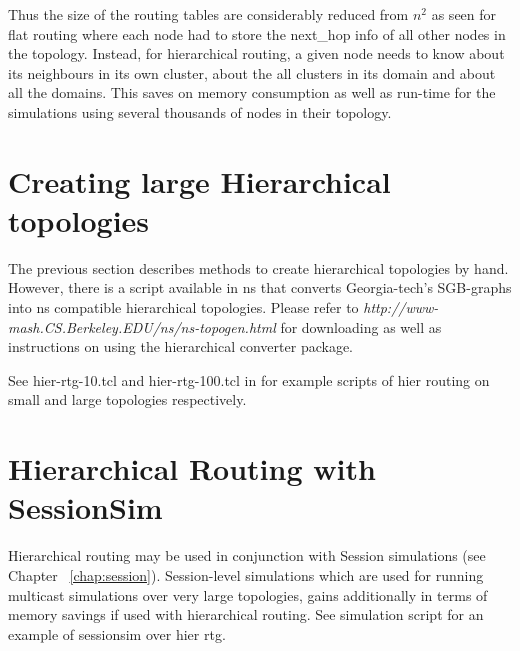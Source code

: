 Thus the size of the routing tables are considerably reduced from 
$n^{2}$ as seen for flat routing where each node had to store the
  next\_hop info of all other nodes in the topology. Instead, for
  hierarchical routing, a given node needs to know about its neighbours
  in its own cluster, about the all clusters in its domain and about all
  the domains. This saves on memory consumption as well as run-time for
  the simulations using several thousands of nodes in their topology.


\section{Creating large Hierarchical topologies}
\label{large-hier-topo}
The previous section describes methods to create hierarchical topologies
by hand. However, there is a script available in ns that converts
Georgia-tech's SGB-graphs into ns compatible hierarchical topologies.
Please refer to {\em http://www-mash.CS.Berkeley.EDU/ns/ns-topogen.html}
for downloading as well as instructions on using the hierarchical
converter package. 

See hier-rtg-10.tcl and hier-rtg-100.tcl in  for example
scripts of hier routing on small and large topologies
respectively. 

\section{Hierarchical Routing with SessionSim}
\label{sec:hier-rtg-with-sessionsim}

Hierarchical routing may be used in conjunction with Session simulations
(see Chapter ~\ref{chap:session}). Session-level simulations which are used
for running multicast simulations over very large topologies, gains
additionally in terms of memory savings if used with hierarchical
routing. See simulation script 
for an example of sessionsim over hier rtg.

\endinput